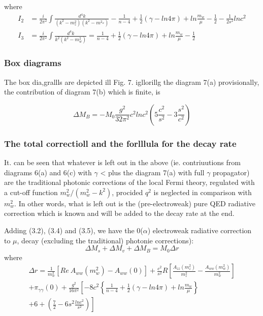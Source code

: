 {where
{\fontsize{8}{10}\selectfont
\begin{align*}
I_{2} & = \frac{i}{2 \pi^{2}} \int \frac{d^{4} k}{(k^{2}-m^{2}_{z})(k^{2}-m^{2_{w}})} - \frac{1}{n-4} + \frac{1}{2} (\gamma -ln 4 \pi) +l n\frac{m_{w}}{\mu} - \frac{1}{2} -\frac{1}{2s^{2}}l n c^{2}\\
I_{3} & = \frac{i}{2\pi^{2}}\int \frac{d^{4} k}{k^{2}(k^{2}-m^{2}_{w})} =\frac{1}{n-4} + \frac{1}{2} (\gamma - l n 4 \pi) + l n \frac{m_{w}}{\mu} -\frac{1}{2}
\end{align*}}


\subsubsection{Box diagrams}

The box dia,grallls are depicted ill Fig. 7. igllorillg the diagram 7(a) provisionally, the contribution of diagram 7(b) which is finite, is

\begin{equation*}
\Delta M_{B}= - M_{0} \frac{g^{2}}{32 \pi^{2}} c^{2} lnc^{2}\left(5 \frac{c^{2}}{s^{2}}- 3 \frac{s^{2}}{c^{2}} \right)\tag{3.5}
\end{equation*}

\subsubsection{The total correctioll and the forlllula for the decay rate}

It. can be seen that whatever is left out in the above (ie. contriuutions from
diagrams 6(a) and 6(c) with $\gamma$ < plus the diagram 7(a) with full $\gamma$ propagator) are the traditional photonic corrections of the local Fermi theory, regulated
with a cut-off function $m^{2}_{w}/(m^{2}_{w}-k^{2})$, procided $q^{2}$ is neglected in comparison
with $m^{2}_{w}$. In other words, what is left out is the (pre-electroweak) pure QED
radiative correction which is known and will be added to the decay rate at the
end. 

Adding (3.2), (3.4) and (3.5), we have the 0($\alpha$) electroweak radiative correction to $\mu$, decay (excluding the traditional) photonie corrections): 
\begin{equation*}
\Delta M_{s}+ \Delta M_{v}+\Delta M_{B}=M_{0}\Delta r\tag{3.6}
\end{equation*}
where
\begin{multline*}
\Delta r=\frac{1}{m^{2}_{w}} [Re~A_{ww}(m^{2}_{w}) -A_{ww}(0) ]+\frac{c^{2}}{s^{2}} R \left[\frac{A_{zz}(m^{2}_{z})}{m^{2}_{z}} - \frac{A_{ww}(m^{2}_{w})}{m^{2}_{w}} \right]\\
+ \pi_{\gamma \gamma}(0) + \frac{g^{2}}{16 \pi^{2}} \left[-8c^{2}\left\{\frac{1}{n-4}+ \frac{1}{2}(\gamma -l n 4\pi ) + ln \frac{m_{w}}{\mu}\right\}\right.\\ 
\left. + 6 + \left(\frac{7}{2}- 6s^{2} \frac{l n c^{2}}{s^{2}} \right) \right]\tag{3.7}
\end{multline*}


}
